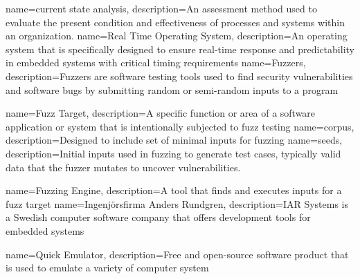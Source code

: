 {
	name=current state analysis,
	description={An assessment method used to evaluate the present condition and
	effectiveness of processes and systems within an organization.}
}
{
	name=Real Time Operating System,
	description={An operating system that is specifically designed to
	ensure real-time response and predictability in embedded systems
	with critical timing requirements}
}
{
	name=Fuzzers,
	description={Fuzzers are software testing tools used to find security
	vulnerabilities and software bugs by submitting random or
	semi-random inputs to a program}
}

{
	name=Fuzz Target,
	description={A specific function or area of a software application or
	system that is intentionally subjected to fuzz testing}
}
{
	name=corpus,
	description={Designed to include set of minimal inputs for fuzzing }
}
{
	name=seeds,
	description={Initial inputs used in fuzzing to generate test cases, typically
	valid data that the fuzzer mutates to uncover vulnerabilities.}
}

{
	name=Fuzzing Engine,
	description={A tool that finds and executes inputs for a fuzz target}
}
{
	name=Ingenjörsfirma Anders Rundgren,
	description={IAR Systems is a Swedish computer software company that
	offers development tools for embedded systems}
}

{
	name=Quick Emulator,
	description={Free and open-source software
	product that is used to emulate a
	variety of computer system}
}